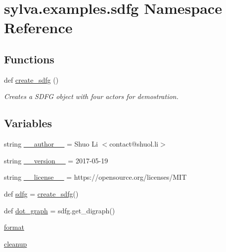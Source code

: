 \hypertarget{namespacesylva_1_1examples_1_1sdfg}{}\section{sylva.\+examples.\+sdfg Namespace Reference}
\label{namespacesylva_1_1examples_1_1sdfg}
\subsection*{Functions}
\begin{DoxyCompactItemize}
\item 
def \hyperlink{namespacesylva_1_1examples_1_1sdfg_ad4206a7c163d26bbbe8173a5f3dc9000}{create\+\_\+sdfg} ()
\begin{DoxyCompactList}\small\item\em Creates a S\+D\+FG object with four actors for demostration. \end{DoxyCompactList}\end{DoxyCompactItemize}
\subsection*{Variables}
\begin{DoxyCompactItemize}
\item 
string \hyperlink{namespacesylva_1_1examples_1_1sdfg_a9767943f0ae15a17015dac550f39bd9d}{\+\_\+\+\_\+author\+\_\+\+\_\+} = \textquotesingle{}Shuo Li $<$contact@shuol.\+li$>$\textquotesingle{}
\item 
string \hyperlink{namespacesylva_1_1examples_1_1sdfg_abe4ddc4d5ea4d8093138a1ffe8e25892}{\+\_\+\+\_\+version\+\_\+\+\_\+} = \textquotesingle{}2017-\/05-\/19\textquotesingle{}
\item 
string \hyperlink{namespacesylva_1_1examples_1_1sdfg_a29b8e50c938ab324beba52e4d6774718}{\+\_\+\+\_\+license\+\_\+\+\_\+} = \textquotesingle{}https\+://opensource.\+org/licenses/M\+IT\textquotesingle{}
\item 
def \hyperlink{namespacesylva_1_1examples_1_1sdfg_a007e0b3d2c0dab8288b9fdc29ce21b98}{sdfg} = \hyperlink{namespacesylva_1_1examples_1_1sdfg_ad4206a7c163d26bbbe8173a5f3dc9000}{create\+\_\+sdfg}()
\item 
def \hyperlink{namespacesylva_1_1examples_1_1sdfg_ab2119d8c7e8a1d2e0e1b4f6be9f1def5}{dot\+\_\+graph} = sdfg.\+get\+\_\+digraph()
\item 
\hyperlink{namespacesylva_1_1examples_1_1sdfg_acbd020c41073525b1ea8420447c2027c}{format}
\item 
\hyperlink{namespacesylva_1_1examples_1_1sdfg_a4c8d33123d39177bbf2baa7990dac03b}{cleanup}
\end{DoxyCompactItemize}


